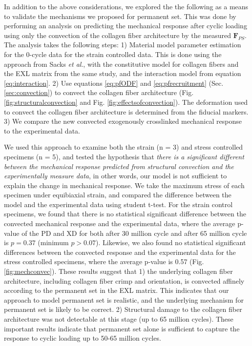 	In addition to the above considerations, we explored the the following as a means to validate the mechanisms we proposed for permanent set. This was done by performing an analysis on predicting the mechanical response after cyclic loading using only the convection of the collagen fiber architecture by the measured $\textbf{F}_{PS}$. The analysis takes the following steps: 1) Material model parameter estimation for the 0-cycle data for the strain controlled data. This is done using the approach from Sacks \textit{et al}.\cite{sacks_novel_2015}, with the constitutive model for collagen fibers and the EXL matrix from the same study, and the interaction model from equation \ref{eq:interaction}. 
	2) Use equations \ref{eq:pfODF} and \ref{eq:pfrecruitment} (Sec.\ref{sec:convection}) to convect the collagen fiber architecture (Fig. \ref{fig:structuralconvection} and Fig. \ref{fig:effectsofconvection}). 
	The deformation used to convect the collagen fiber architecture is determined from the fiducial markers. 
	3) We compare the new convected exogenously crosslinked mechanical response to the experimental data.


	We used this approach to examine both the strain (n = 3) and stress controlled specimens (n = 5), and tested the hypothesis that \emph{there is a significant different between the mechanical response predicted from structural convection and the experimentally measure data}, in other words, our model is not sufficient to explain the change in mechanical response. We take the maximum stress of each specimen under equibiaxial strain, and compared the difference between the model and the experimental data using student t-test.	For the strain control specimens, we found that there is no statistical significant difference between the convected mechanical response and the experimental data, where the average p-value of the PD and XD for both after 30 million cycle and after 65 million cycle is $p = 0.37$ (minimum $p > 0.07$). 
	Likewise, we also found no statistical significant differences between the convected response and the experimental data for the stress controlled specimens, where the average p-value is 0.57 (Fig. \ref{fig:mechconvec}).
	These results suggest that 1) the underlying collagen fiber architecture, including collagen fiber crimp and orientation, is convected affinely according to the permanent set in the EXL matrix. This indicates that our approach to model permanent set is realistic, and the underlying mechanism for permanent set is likely to be correct. 
	2) Structural damage to the collagen fiber architecture was not detectable at this stage (up to 65 million cycles). 
	These important results indicate that permanent set alone is sufficient to capture the response to cyclic loading up to 50-65 million cycles. 


